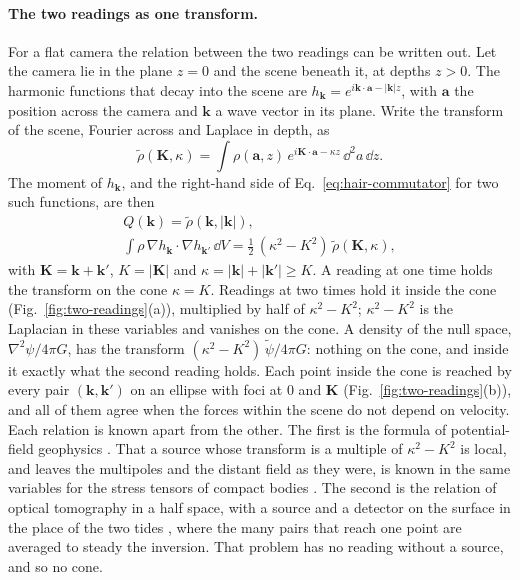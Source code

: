 \paragraph{The two readings as one transform.} For a flat camera the relation
between the two readings can be written out. Let the camera lie in the plane
$z = 0$ and the scene beneath it, at depths $z > 0$. The harmonic functions
that decay into the scene are
$h_{\mathbf k} = e^{i\mathbf k\cdot\mathbf a - |\mathbf k|z}$, with $\mathbf a$
the position across the camera and $\mathbf k$ a wave vector in its plane.
Write the transform of the scene, Fourier across and Laplace in depth, as
\begin{equation}\label{eq:scene-transform}
\tilde\rho(\mathbf K, \kappa) = \int\rho(\mathbf a, z)\,
e^{i\mathbf K\cdot\mathbf a - \kappa z}\,\dd^2a\,\dd z .
\end{equation}
The moment of $h_{\mathbf k}$, and the right-hand side of
Eq.~\eqref{eq:hair-commutator} for two such functions, are then
\begin{equation}\label{eq:cone}
\begin{gathered}
Q(\mathbf k) = \tilde\rho(\mathbf k, |\mathbf k|),\\
\int\rho\,\nabla h_{\mathbf k}\cdot\nabla h_{\mathbf k'}\,\dd V
= \tfrac12\,(\kappa^2 - K^2)\,\tilde\rho(\mathbf K, \kappa),
\end{gathered}
\end{equation}
with $\mathbf K = \mathbf k + \mathbf k'$, $K = |\mathbf K|$ and
$\kappa = |\mathbf k| + |\mathbf k'| \ge K$. A reading at one time holds the
transform on the cone $\kappa = K$. Readings at two times hold it inside the
cone (Fig.~\ref{fig:two-readings}(a)), multiplied by half of $\kappa^2 - K^2$; $\kappa^2 - K^2$ is the Laplacian in these
variables and vanishes on the cone. A density of the null space,
$\nabla^2\psi/4\pi G$, has the transform $(\kappa^2 - K^2)\,\tilde\psi/4\pi G$:
nothing on the cone, and inside it exactly what the second reading holds. Each
point inside the cone is reached by every pair $(\mathbf k, \mathbf k')$ on an
ellipse with foci at $0$ and $\mathbf K$ (Fig.~\ref{fig:two-readings}(b)), and
all of them agree when the
forces within the scene do not depend on velocity. Each relation is known
apart from the other. The first is the formula of potential-field geophysics
\cite{Parker1973}. That a source whose transform is a multiple of
$\kappa^2 - K^2$ is local, and leaves the multipoles and the distant field as
they were, is known in the same variables for the stress tensors of compact
bodies \cite{GoldbergerRothstein2006a,BianchiEtAl2025}. The second is the
relation of optical tomography in a half space, with a source and a detector
on the surface in the place of the two tides
\cite{MarkelSchotland2001,ArridgeSchotland2009}, where the many pairs that
reach one point are averaged to steady the inversion. That problem has no
reading without a source, and so no cone.

